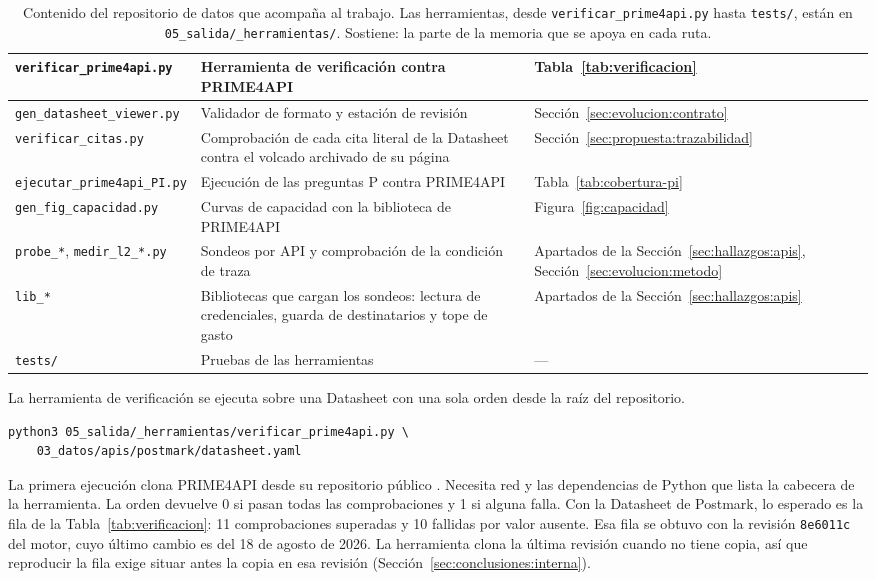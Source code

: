 \begin{table}[H]
\begin{tabular}{|p{4.6cm}|p{6.2cm}|p{3.2cm}|}
\hline
\texttt{verificar\_prime4api.py} & Herramienta de verificación contra PRIME4API & Tabla~\ref{tab:verificacion} \\
\hline
\texttt{gen\_datasheet\_viewer.py} & Validador de formato y estación de revisión & Sección~\ref{sec:evolucion:contrato} \\
\hline
\texttt{verificar\_citas.py} & Comprobación de cada cita literal de la Datasheet contra el volcado archivado de su página & Sección~\ref{sec:propuesta:trazabilidad} \\
\hline
\texttt{ejecutar\_prime4api\_PI.py} & Ejecución de las preguntas P contra PRIME4API & Tabla~\ref{tab:cobertura-pi} \\
\hline
\texttt{gen\_fig\_capacidad.py} & Curvas de capacidad con la biblioteca de PRIME4API & Figura~\ref{fig:capacidad} \\
\hline
\texttt{probe\_*}, \texttt{medir\_l2\_*.py} & Sondeos por API y comprobación de la condición de traza & Apartados de la Sección~\ref{sec:hallazgos:apis}, Sección~\ref{sec:evolucion:metodo} \\
\hline
\texttt{lib\_*} & Bibliotecas que cargan los sondeos: lectura de credenciales, guarda de destinatarios y tope de gasto & Apartados de la Sección~\ref{sec:hallazgos:apis} \\
\hline
\texttt{tests/} & Pruebas de las herramientas & --- \\
\hline
\end{tabular}
\caption{Contenido del repositorio de datos que acompaña al trabajo. Las herramientas, desde \texttt{verificar\_prime4api.py} hasta \texttt{tests/}, están en \texttt{05\_salida/\_herramientas/}. Sostiene: la parte de la memoria que se apoya en cada ruta.}
\label{tab:conclusiones:paquete}
\end{table}

La herramienta de verificación se ejecuta sobre una Datasheet con una sola orden desde la raíz del repositorio.

\begin{lstlisting}
python3 05_salida/_herramientas/verificar_prime4api.py \
    03_datos/apis/postmark/datasheet.yaml
\end{lstlisting}

La primera ejecución clona PRIME4API desde su repositorio público \citep{prime4apirepo}.
Necesita red y las dependencias de Python que lista la cabecera de la herramienta.
La orden devuelve 0 si pasan todas las comprobaciones y 1 si alguna falla.
Con la Datasheet de Postmark, lo esperado es la fila de la Tabla~\ref{tab:verificacion}: 11 comprobaciones superadas y 10 fallidas por valor ausente.
Esa fila se obtuvo con la revisión \texttt{8e6011c} del motor, cuyo último cambio es del 18 de agosto de 2026.
La herramienta clona la última revisión cuando no tiene copia, así que reproducir la fila exige situar antes la copia en esa revisión (Sección~\ref{sec:conclusiones:interna}).

